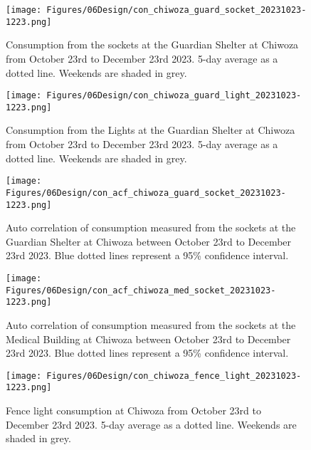 \begin{figure}[]
    \centering
    \texttt{[image: Figures/06Design/con\_chiwoza\_guard\_socket\_20231023-1223.png]}
    \caption[Guardina Shelter Socket consumption Chiwoza 20231023-1223]{Consumption from the sockets at the Guardian Shelter at Chiwoza from October 23rd to December 23rd 2023. 5-day average as a dotted line. Weekends are shaded in grey.}
    \label{fig:con_chiwoza_guard_socket_20231023-1223}
\end{figure}

\begin{figure}[]
    \centering
    \texttt{[image: Figures/06Design/con\_chiwoza\_guard\_light\_20231023-1223.png]}
    \caption[Guardian Shelter Light consumption Chiwoza 20231023-1223]{Consumption from the Lights at the Guardian Shelter at Chiwoza from October 23rd to December 23rd 2023. 5-day average as a dotted line. Weekends are shaded in grey.}
    \label{fig:con_chiwoza_guard_light_20231023-1223}
\end{figure}

\begin{figure}[]
\centering
\texttt{[image: Figures/06Design/con\_acf\_chiwoza\_guard\_socket\_20231023-1223.png]}
\caption[ACF Guardian shelter socket consumption Chiwoza 20231023-1223]{Auto correlation of consumption measured from the sockets at the Guardian Shelter at Chiwoza between October 23rd to December 23rd 2023. Blue dotted lines represent a 95\% confidence interval.}
\label{fig:con_acf_chiwoza_guard_socket_20231023-1223}
\end{figure}

\begin{figure}[]
\centering
\texttt{[image: Figures/06Design/con\_acf\_chiwoza\_med\_socket\_20231023-1223.png]}
\caption[ACF Medical Socket consumption Chiwoza 20231023-1223]{Auto correlation of consumption measured from the sockets at the Medical Building at Chiwoza between October 23rd to December 23rd 2023. Blue dotted lines represent a 95\% confidence interval.}
\label{fig:con_acf_chiwoza_med_socket_20231023-1223}
\end{figure}

\begin{figure}[]
    \centering
    \texttt{[image: Figures/06Design/con\_chiwoza\_fence\_light\_20231023-1223.png]}
    \caption[Fence Light consumption Chiwoza 20231023-1223]{Fence light consumption at Chiwoza from October 23rd to December 23rd 2023. 5-day average as a dotted line. Weekends are shaded in grey.}
    \label{fig:con_chiwoza_fence_light_20231023-1223}
\end{figure}

